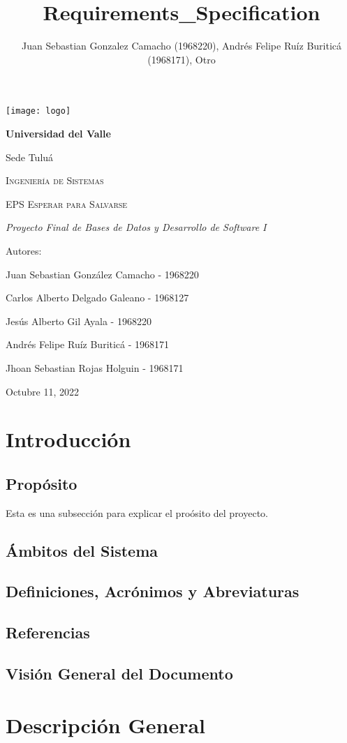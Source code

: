 \documentclass[12pt,a4paper]{article}
\author{Juan Sebastian Gonzalez Camacho (1968220), Andrés Felipe Ruíz Buriticá (1968171), Otro}
\title{Requirements_Specification}
\begin{document}
\begin{titlepage}
\centering
{\texttt{[image: logo]} \par}
\vfill
{\bfseries\LARGE Universidad del Valle\par}
{\Large Sede Tuluá\par}
\vfill
{\scshape\Large Ingeniería de Sistemas \par}
\vfill
{\scshape\Huge EPS Esperar para Salvarse \par}
\vfill
{\itshape\Large Proyecto Final de Bases de Datos y Desarrollo de Software I \par}
\vfill
{\Large Autores: \par}
{\Large Juan Sebastian González Camacho - 1968220 \par}
{\Large Carlos Alberto Delgado Galeano - 1968127 \par}
{\Large Jesús Alberto Gil Ayala - 1968220 \par}
{\Large Andrés Felipe Ruíz Buriticá - 1968171 \par}
{\Large Jhoan Sebastian Rojas Holguin - 1968171 \par}
\vfill
{\Large Octubre 11, 2022 \par}
\end{titlepage}
\tableofcontents
\newpage
\section{Introducción}

\subsection{Propósito}
Esta es una subsección para explicar el proósito del proyecto.
\subsection{Ámbitos del Sistema}
\subsection{Definiciones, Acrónimos y Abreviaturas}
\subsection{Referencias}
\subsection{Visión General del Documento}
\section{Descripción General}
\end{document}
